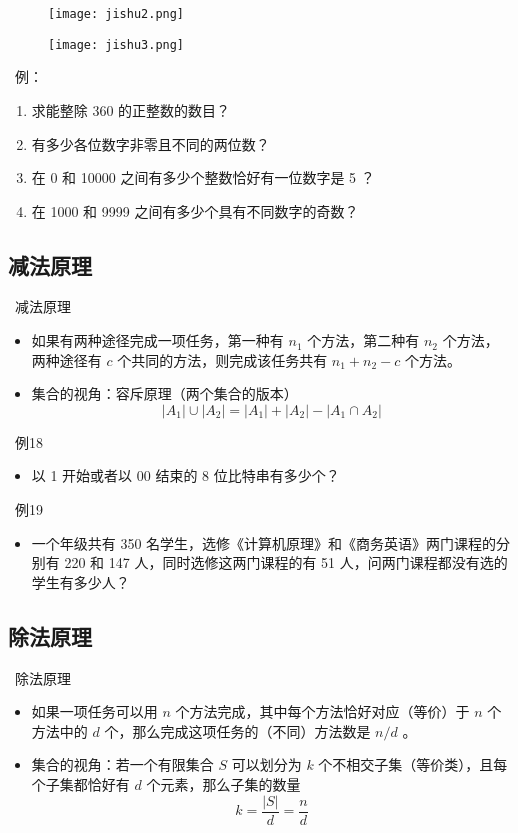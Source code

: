 \documentclass[UTF8]{report}
\theoremstyle{MyLineTheoremStyle} %
\theoremstyle{MyBlockTheoremStyle} %
\theoremstyle{MySubsubsectionStyle} %
\begin{document}
\begin{figure}[H]
    \centering
    \texttt{[image: jishu2.png]}
\end{figure}

\begin{figure}
    \centering
    \texttt{[image: jishu3.png]}
\end{figure}


\textbullet\ 例：
\begin{enumerate}
    \item 求能整除 360 的正整数的数目？
    \item 有多少各位数字非零且不同的两位数？
    \item 在 0 和 10000 之间有多少个整数恰好有一位数字是 5 ？
    \item 在 1000 和 9999 之间有多少个具有不同数字的奇数？
\end{enumerate}

\subsection{减法原理}
\textbullet\ 减法原理
\begin{itemize}
    \item 如果有两种途径完成一项任务，第一种有 $n_1$ 个方法，第二种有 $n_2$ 个方法，两种途径有 $c$ 个共同的方法，则完成该任务共有 $n_1 + n_2 - c$ 个方法。
    \item 集合的视角：容斥原理（两个集合的版本）
    \[
    |A_1| \cup |A_2| = |A_1| + |A_2| - |A_1 \cap A_2|
    \]
\end{itemize}

\textbullet\ 例18
\begin{itemize}
    \item 以 1 开始或者以 00 结束的 8 位比特串有多少个？
\end{itemize}

\textbullet\ 例19
\begin{itemize}
    \item 一个年级共有 350 名学生，选修《计算机原理》和《商务英语》两门课程的分别有 220 和 147 人，同时选修这两门课程的有 51 人，问两门课程都没有选的学生有多少人？
\end{itemize}

\subsection{除法原理}
\textbullet\ 除法原理
\begin{itemize}
    \item 如果一项任务可以用 $n$ 个方法完成，其中每个方法恰好对应（等价）于 $n$ 个方法中的 $d$ 个，那么完成这项任务的（不同）方法数是 $n/d$ 。
    \item 集合的视角：若一个有限集合 $S$ 可以划分为 $k$ 个不相交子集（等价类），且每个子集都恰好有 $d$ 个元素，那么子集的数量
    \[
    k = \frac{|S|}{d} = \frac{n}{d}
    \]
\end{itemize}
\end{document}
